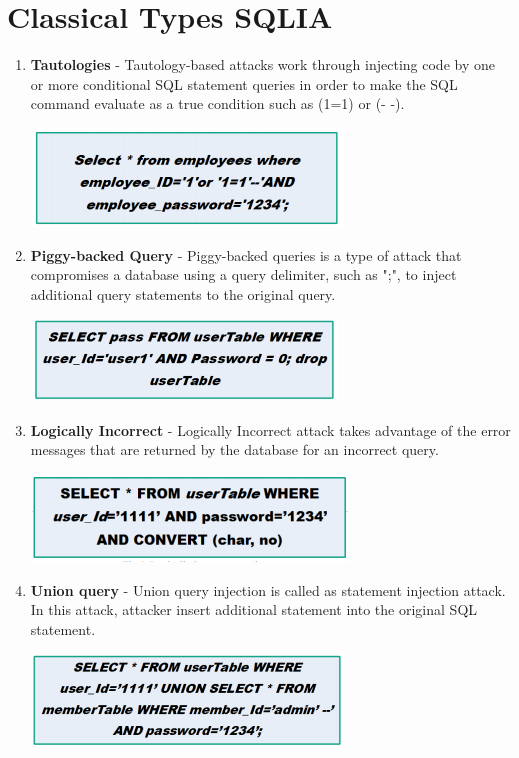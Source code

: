 \documentclass{article}
\begin{document}
\section*{Classical Types SQLIA}
\begin{enumerate}
\item \textbf{Tautologies} - Tautology-based attacks work through injecting code by one or more conditional SQL statement queries in order
to make the SQL command evaluate as a true condition such as (1=1) or (- -).
\begin{center}
\includegraphics[scale=1]{2}
\end{center}
\item \textbf{Piggy-backed Query} - Piggy-backed queries is a type of attack that compromises a database using a query delimiter, such as
";", to inject additional query statements to the original query.
\begin{center}
\includegraphics[scale=1]{3}
\end{center}
\item \textbf{Logically Incorrect} - Logically Incorrect attack takes advantage of the error messages that are returned by the
database for an incorrect query.
\begin{center}
\includegraphics[scale=1]{4}
\end{center}
\item \textbf{Union query} - Union query injection is called as statement injection attack. In this attack, attacker insert
additional statement into the original SQL statement. 
\begin{center}
\includegraphics[scale=1]{5}

\end{center}
\end{enumerate}
\end{document}
